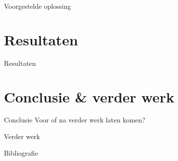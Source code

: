 \documentclass[presentation, bigger]{beamer}
\begin{document}
\begin{frame}{Voorgestelde oplossing}
\end{frame}

\section{Resultaten}
\begin{frame}{Resultaten}

\end{frame}


\section{Conclusie \& verder werk}
\begin{frame}{Conclusie}
Voor of na verder werk laten komen?
\end{frame}

\begin{frame}{Verder werk}
\end{frame}

\begin{frame}[allowframebreaks]{Bibliografie}

  \nocite{*}
  \printbibliography
\end{frame}
\end{document}
